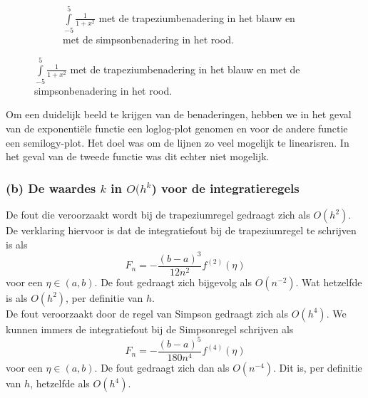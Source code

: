 \documentclass[11pt,a4paper]{article}
\begin{document}
\begin{figure}[H]
\begin{subfigure}{0.5\textwidth}
	\caption*{$\int\limits_{-5}^5\frac{1}{1+x^2}$ met de trapeziumbenadering in het blauw en met de simpsonbenadering in het rood.}
	\end{subfigure}

\end{figure}

Om een duidelijk beeld te krijgen van de benaderingen, hebben we in het geval van de exponenti\"ele functie een loglog-plot genomen en voor de andere functie een semilogy-plot. Het doel was om de lijnen zo veel mogelijk te linearisren. In het geval van de tweede functie was dit echter niet mogelijk.

\subsubsection*{(b) De waardes $k$ in $O(h^k$) voor de integratieregels}

De fout die veroorzaakt wordt bij de trapeziumregel gedraagt zich als $O(h^2)$. De verklaring hiervoor is dat de integratiefout bij de trapeziumregel te schrijven is als \[ F_n = -\dfrac{(b-a)^3}{12n^2}f^{(2)}(\eta) \] voor een $\eta \in (a,b)$. De fout gedraagt zich bijgevolg als $O(n^{-2})$. Wat hetzelfde is als $O(h^2)$, per definitie van $h$.
\\
De fout veroorzaakt door de regel van Simpson gedraagt zich als $O(h^4)$. We kunnen immers de integratiefout bij de Simpsonregel schrijven als \[ F_n = -\dfrac{(b-a)^5}{180n^4}f^{(4)}(\eta) \] voor een $\eta \in (a,b)$. De fout gedraagt zich dan als $O(n^{-4})$. Dit is, per definitie van $h$, hetzelfde als $O(h^4)$.
\end{document}

